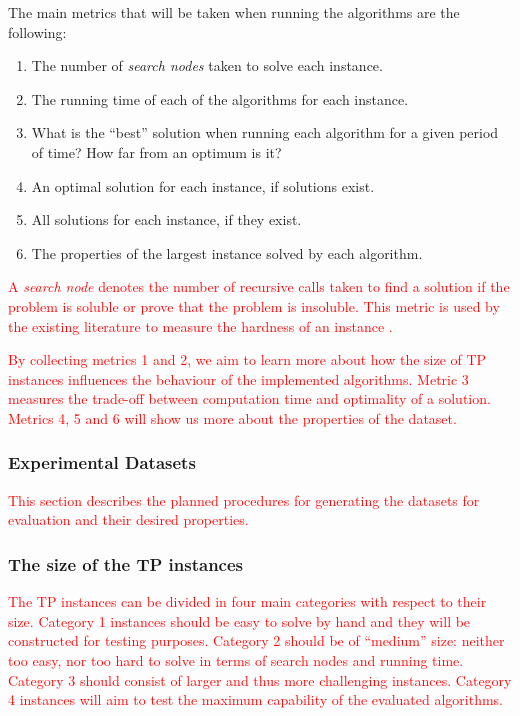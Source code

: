 \documentclass{mprop}
\theoremstyle{definition}
\begin{document}
The main metrics that will be taken when running the algorithms are the following:
\begin{enumerate}
\color{red}
\item The number of \textit{search nodes} taken to solve each instance.
\item The running time of each of the algorithms for each instance.
\item What is the ``best'' solution when running each algorithm for a given period of time? How far from an optimum is it?
\item An optimal solution for each instance, if solutions exist.
\item All solutions for each instance, if they exist.
\item The properties of the largest instance solved by each algorithm.
\end{enumerate}

\textcolor{red}{
A \textit{search node} denotes the number of recursive calls taken to find a solution if the problem is soluble or prove that the problem is insoluble. This metric is used by the existing literature to measure the hardness of an instance \citep{McCreesh16}.}

\textcolor{red}{By collecting metrics 1 and 2, we aim to learn more about how the size of TP instances influences the behaviour of the implemented algorithms. Metric 3 measures the trade-off between computation time and optimality of a solution. Metrics 4, 5 and 6 will show us more about the properties of the dataset.}

\subsubsection{Experimental Datasets}
\label{sec:datasets}

\textcolor{red}{This section describes the planned procedures for generating the datasets for evaluation and their desired properties.}

\subsubsection*{The size of the TP instances}
\textcolor{red}{
The TP instances can be divided in four main categories with respect to their size. Category 1 instances should be easy to solve by hand and they will be constructed for testing purposes. Category 2 should be of ``medium'' size: neither too easy, nor too hard to solve in terms of search nodes and running time. Category 3 should consist of larger and thus more challenging instances. Category 4 instances will aim to test the maximum capability of the evaluated algorithms.}
\end{document}
